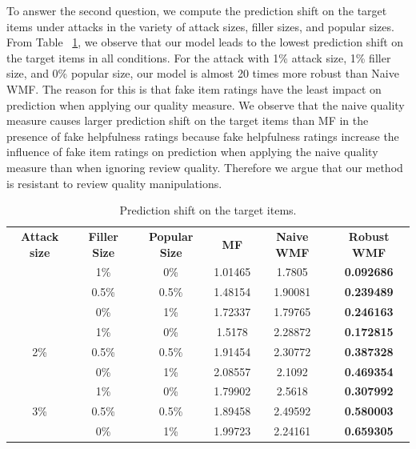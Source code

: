 \documentclass[master,english,final]{kaist-ucs}
\begin{document}
To answer the second question, we compute the prediction shift on the target items under attacks in the variety of attack sizes, filler sizes, and popular sizes.
From Table ~\ref{resultPredictionShift}, we observe that our model leads to the lowest prediction shift on the target items in all conditions.
For the attack with 1\% attack size, 1\% filler size, and 0\% popular size, our model is almost 20 times more robust than Naive WMF.
The reason for this is that fake item ratings have the least impact on prediction when applying our quality measure.
We observe that the naive quality measure causes larger prediction shift on the target items than MF in the presence of fake helpfulness ratings because fake helpfulness ratings increase the influence of fake item ratings on prediction when applying the naive quality measure than when ignoring review quality.
Therefore we argue that our method is resistant to review quality manipulations.
\begin{table}[h]
\caption{Prediction shift on the target items.}
\label{resultPredictionShift}
\begin{center}
\begin{tabular}{|c|c|c||c|c|c|}
\hline
\textbf{Attack size} & \textbf{Filler Size} & \textbf{Popular Size} & \textbf{MF} & \textbf{Naive WMF} & \textbf{Robust WMF} \\ \hhline{======}
\multirow{3}{*}{1\%} & 1\%                  & 0\%                   & 1.01465       & 1.7805         & \textbf{0.092686} \\ \cline{2-6}
                     & 0.5\%               & 0.5\%                & 1.48154       & 1.90081        & \textbf{0.239489} \\ \cline{2-6}
                     & 0\%                  & 1\%                   & 1.72337       & 1.79765        & \textbf{0.246163} \\ \hline
\multirow{3}{*}{2\%} & 1\%                  & 0\%                   & 1.5178        & 2.28872        & \textbf{0.172815} \\ \cline{2-6}
                     & 0.5\%               & 0.5\%                & 1.91454       & 2.30772        & \textbf{0.387328} \\ \cline{2-6}
                     & 0\%                  & 1\%                   & 2.08557       & 2.1092         & \textbf{0.469354} \\ \hline
\multirow{3}{*}{3\%} & 1\%                  & 0\%                   & 1.79902       & 2.5618         & \textbf{0.307992} \\ \cline{2-6}
                     & 0.5\%               & 0.5\%                & 1.89458       & 2.49592        & \textbf{0.580003} \\ \cline{2-6}
                     & 0\%                  & 1\%                   & 1.99723       & 2.24161        & \textbf{0.659305} \\ \hline
\end{tabular}
\end{center}
\end{table}
\end{document}

